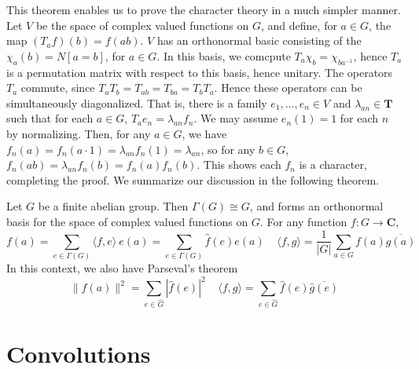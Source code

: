 This theorem enables us to prove the character theory in a much simpler manner. Let $V$ be the space of complex valued functions on $G$, and define, for $a \in G$, the map $(T_a f)(b) = f(ab)$. $V$ has an orthonormal basic consisting of the $\chi_a(b) = N [a = b]$, for $a \in G$. In this basis, we comcpute $T_a \chi_b = \chi_{ba^{-1}}$, hence $T_a$ is a permutation matrix with respect to this basis, hence unitary. The operators $T_a$ commute, since $T_aT_b = T_{ab} = T_{ba} = T_b T_a$. Hence these operators can be simultaneously diagonalized. That is, there is a family $e_1, \dots, e_n \in V$ and $\lambda_{an} \in \mathbf{T}$ such that for each $a \in G$, $T_a e_n = \lambda_{an} f_n$. We may assume $e_n(1) = 1$ for each $n$ by normalizing. Then, for any $a \in G$, we have $f_n(a) = f_n(a \cdot 1) = \lambda_{an} f_n(1) = \lambda_{an}$, so for any $b \in G$, $f_n(ab) = \lambda_{an} f_n(b) = f_n(a) f_n(b)$. This shows each $f_n$ is a character, completing the proof. We summarize our discussion in the following theorem.

\begin{theorem}
    Let $G$ be a finite abelian group. Then $\Gamma(G) \cong G$, and forms an orthonormal basis for the space of complex valued functions on $G$. For any function $f: G \to \mathbf{C}$,
    \[ f(a) = \sum_{e \in \Gamma(G)} \langle f, e \rangle\ e(a) = \sum_{e \in \Gamma(G)} \hat{f}(e) e(a)\ \ \ \ \ \langle f, g \rangle = \frac{1}{|G|} \sum_{a \in G} f(a) \overline{g(a)} \]
    In this context, we also have Parseval's theorem
    \[ \| f(a) \|^2 = \sum_{e \in \hat{G}} |\widehat{f}(e)|^2\ \ \ \ \ \langle f, g \rangle = \sum_{e \in \hat{G}} \widehat{f}(e) \overline{\widehat{g}(e)} \]
\end{theorem}

\section{Convolutions}

